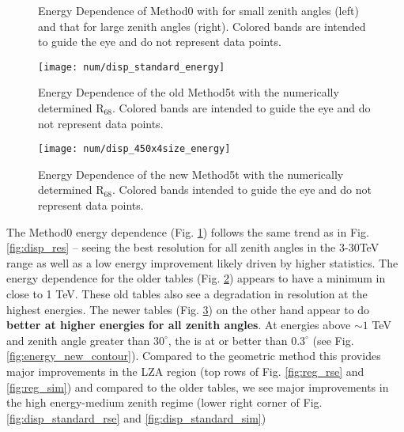\documentclass[main.tex]{subfiles}
\begin{document}
\begin{figure}[htbp]
  \centering
  \caption[Energy Dependence of Method0.]{Energy Dependence of Method0 with \rse for small zenith angles (left) and that for large zenith angles (right). Colored bands are intended to guide the eye and do not represent data points.}
  \label{fig:energy_reg}
\end{figure}

\begin{figure}[htbp]
  \centering
  \texttt{[image: num/disp\_standard\_energy]}
  \caption[Energy Dependence of the old Method5t.]{Energy Dependence of the old Method5t with the numerically determined R$_{68}$. Colored bands are intended to guide the eye and do not represent data points.}
  \label{fig:energy_disp_standard}    
\end{figure}

\begin{figure}[htbp]
  \centering
  \texttt{[image: num/disp\_450x4size\_energy]}
  \caption[Energy Dependence of the new Method5t.]{Energy Dependence of the new Method5t with the numerically determined R$_{68}$. Colored bands intended to guide the eye and do not represent data points.}
  \label{fig:energy_disp_450}    
\end{figure}

The Method0 energy dependence (Fig. \ref{fig:energy_reg}) follows the same trend as in Fig. \ref{fig:disp_res} -- seeing the best resolution for all zenith angles in the 3-30TeV range as well as a low energy improvement likely driven by higher statistics. The energy dependence for the older \disp tables (Fig. \ref{fig:energy_disp_standard}) appears to have a minimum in \rse close to 1 TeV. These old \disp tables also see a degradation in resolution at the highest energies. The newer \disp tables (Fig. \ref{fig:energy_disp_450}) on the other hand appear to do {\bf better at higher energies for all zenith angles}. At energies above $\sim 1$ TeV and zenith angle greater than $30^\circ$, the \rse is at or better than $0.3^\circ$ (see Fig. \ref{fig:energy_new_contour}). Compared to the geometric method this provides major improvements in the LZA region (top rows of Fig. \ref{fig:reg_rse} and \ref{fig:reg_sim}) and compared to the older \disp tables, we see major improvements in the high energy-medium zenith regime (lower right corner of Fig. \ref{fig:disp_standard_rse} and \ref{fig:disp_standard_sim})
\end{document}
